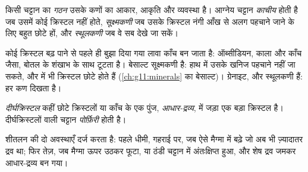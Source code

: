 \begin{definition}[गठन]\label{def:g11:igneous-rocks:texture}
किसी चट्टान का \emph{गठन} उसके कणों का आकार, आकृति
और व्यवस्था है। आग्नेय चट्टान \emph{काचीय} होती है जब
उसमें कोई क्रिस्टल नहीं होते, \emph{सूक्ष्मकणी} जब उसके क्रिस्टल नंगी आँख से अलग
पहचाने जाने के लिए बहुत छोटे हों, और \emph{स्थूलकणी} जब वे सब
देखे जा सकें।
\end{definition}

कोई क्रिस्टल बढ़ पाने से पहले ही बुझा दिया गया लावा काँच बन जाता है: ऑब्सीडियन, काला
और काँच जैसा, बोतल के शंखाभ  के साथ टूटता है। बेसाल्ट
सूक्ष्मकणी है: हाथ में उसके खनिज पहचाने नहीं जा सकते, और  में भी क्रिस्टल छोटे होते हैं (\cref{ch:g11:minerals} का बेसाल्ट)।
ग्रेनाइट,  और  स्थूलकणी हैं: हर कण दिखता है।

\begin{definition}[दीर्घक्रिस्टल; पोर्फ़िरी]\label{def:g11:igneous-rocks:porphyritic}
\emph{दीर्घक्रिस्टल} कहीं छोटे क्रिस्टलों या काँच के एक पुंज,
\emph{आधार-द्रव्य}, में जड़ा एक बड़ा क्रिस्टल है। दीर्घक्रिस्टलों वाली
चट्टान \emph{पोर्फ़िरी} होती है।
\end{definition}

  शीतलन की दो अवस्थाएँ दर्ज करता है: पहले धीमी, गहराई पर,
जब  ऐसे मैग्मा में बढ़े जो अब भी ज़्यादातर द्रव था; फिर
तेज़, जब मैग्मा ऊपर उठकर फूटा, या ठंडी चट्टान में अंतःक्षिप्त हुआ, और
शेष द्रव जमकर आधार-द्रव्य बन गया।


